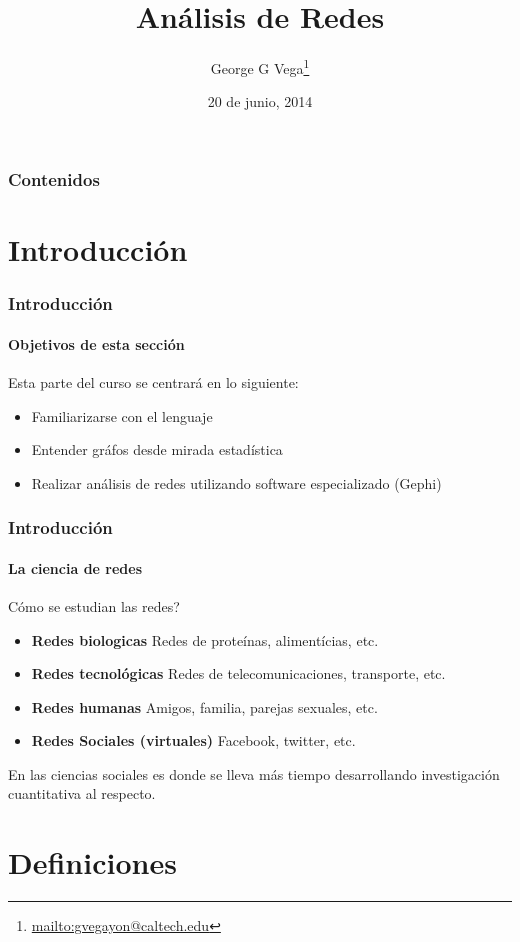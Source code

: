 \documentclass{beamer}
\author{George G Vega\thanks{\url{mailto:gvegayon@caltech.edu}}}
\institute{Superintendencia de Pensiones}
\title{An\'alisis de Redes}
\date{20 de junio, 2014}
\begin{document}
\frame{\maketitle}

\begin{frame}
\frametitle{Contenidos}
\tableofcontents
\end{frame}

\section{Introducci\'on}

\begin{frame}
\frametitle{Introducci\'on}
\framesubtitle{Objetivos de esta secci\'on}

Esta parte del curso se centrar\'a en lo siguiente:

\begin{itemize}
\item Familiarizarse con el lenguaje
\item Entender gr\'afos desde mirada estad\'istica
\item Realizar an\'alisis de redes utilizando software especializado (Gephi)
\end{itemize}

\end{frame}

\begin{frame}
\frametitle{Introducci\'on}
\framesubtitle{La ciencia de redes}

C\'omo se estudian las redes?

\begin{itemize}
\item {\bf Redes biologicas} Redes de prote\'inas, aliment\'icias, etc.
\item {\bf Redes tecnol\'ogicas} Redes de telecomunicaciones, transporte, etc.
\item {\bf Redes humanas} Amigos, familia, parejas sexuales, etc.
\item {\bf Redes Sociales (virtuales)} Facebook, twitter, etc.
\end{itemize}

En las ciencias sociales es donde se lleva m\'as tiempo desarrollando investigaci\'on
cuantitativa al respecto.

\end{frame}

\section{Definiciones}
\end{document}

